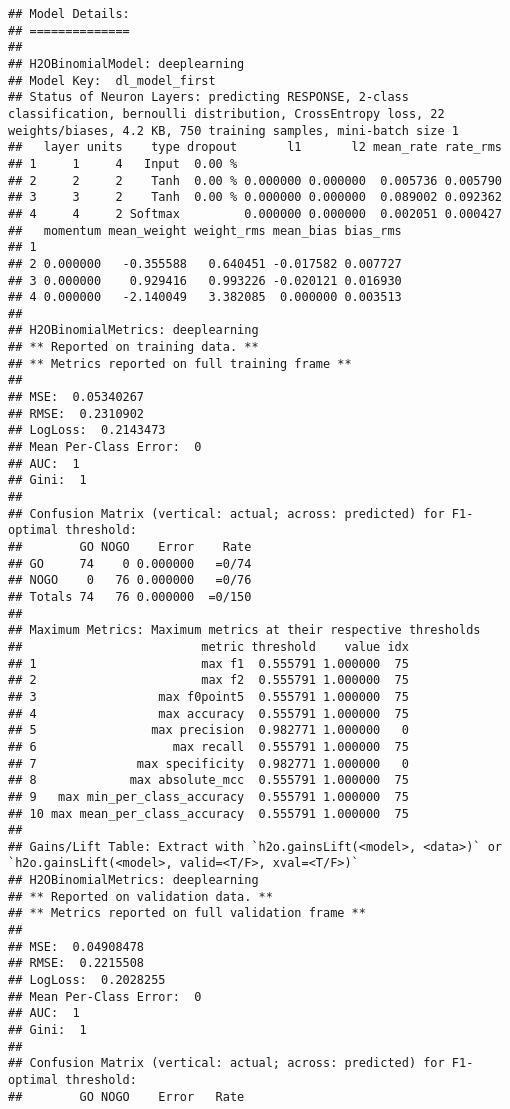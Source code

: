 \documentclass[]{article}
\begin{document}
\begin{verbatim}
## Model Details:
## ==============
## 
## H2OBinomialModel: deeplearning
## Model Key:  dl_model_first 
## Status of Neuron Layers: predicting RESPONSE, 2-class classification, bernoulli distribution, CrossEntropy loss, 22 weights/biases, 4.2 KB, 750 training samples, mini-batch size 1
##   layer units    type dropout       l1       l2 mean_rate rate_rms
## 1     1     4   Input  0.00 %                                     
## 2     2     2    Tanh  0.00 % 0.000000 0.000000  0.005736 0.005790
## 3     3     2    Tanh  0.00 % 0.000000 0.000000  0.089002 0.092362
## 4     4     2 Softmax         0.000000 0.000000  0.002051 0.000427
##   momentum mean_weight weight_rms mean_bias bias_rms
## 1                                                   
## 2 0.000000   -0.355588   0.640451 -0.017582 0.007727
## 3 0.000000    0.929416   0.993226 -0.020121 0.016930
## 4 0.000000   -2.140049   3.382085  0.000000 0.003513
## 
## H2OBinomialMetrics: deeplearning
## ** Reported on training data. **
## ** Metrics reported on full training frame **
## 
## MSE:  0.05340267
## RMSE:  0.2310902
## LogLoss:  0.2143473
## Mean Per-Class Error:  0
## AUC:  1
## Gini:  1
## 
## Confusion Matrix (vertical: actual; across: predicted) for F1-optimal threshold:
##        GO NOGO    Error    Rate
## GO     74    0 0.000000   =0/74
## NOGO    0   76 0.000000   =0/76
## Totals 74   76 0.000000  =0/150
## 
## Maximum Metrics: Maximum metrics at their respective thresholds
##                         metric threshold    value idx
## 1                       max f1  0.555791 1.000000  75
## 2                       max f2  0.555791 1.000000  75
## 3                 max f0point5  0.555791 1.000000  75
## 4                 max accuracy  0.555791 1.000000  75
## 5                max precision  0.982771 1.000000   0
## 6                   max recall  0.555791 1.000000  75
## 7              max specificity  0.982771 1.000000   0
## 8             max absolute_mcc  0.555791 1.000000  75
## 9   max min_per_class_accuracy  0.555791 1.000000  75
## 10 max mean_per_class_accuracy  0.555791 1.000000  75
## 
## Gains/Lift Table: Extract with `h2o.gainsLift(<model>, <data>)` or `h2o.gainsLift(<model>, valid=<T/F>, xval=<T/F>)`
## H2OBinomialMetrics: deeplearning
## ** Reported on validation data. **
## ** Metrics reported on full validation frame **
## 
## MSE:  0.04908478
## RMSE:  0.2215508
## LogLoss:  0.2028255
## Mean Per-Class Error:  0
## AUC:  1
## Gini:  1
## 
## Confusion Matrix (vertical: actual; across: predicted) for F1-optimal threshold:
##        GO NOGO    Error   Rate

\end{verbatim}
\end{document}
